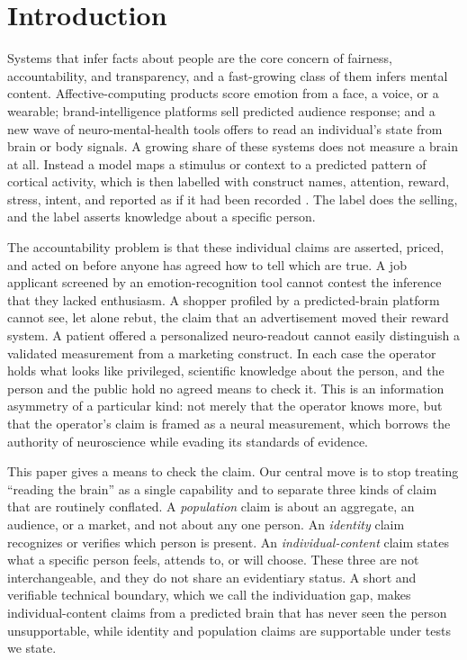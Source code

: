 \documentclass[sigconf,review,anonymous]{acmart}
\begin{document}
\section{Introduction}
Systems that infer facts about people are the core concern of fairness, accountability, and transparency, and
a fast-growing class of them infers mental content. Affective-computing products score emotion from a face,
a voice, or a wearable; brand-intelligence platforms sell predicted audience response; and a new wave of
neuro-mental-health tools offers to read an individual's state from brain or body signals. A growing share of
these systems does not measure a brain at all. Instead a model maps a stimulus or context to a predicted
pattern of cortical activity, which is then labelled with construct names, attention, reward, stress, intent,
and reported as if it had been recorded \cite{poldrack2006,hutzler2013,yao2024}. The label does the selling,
and the label asserts knowledge about a specific person.

The accountability problem is that these individual claims are asserted, priced, and acted on before anyone
has agreed how to tell which are true. A job applicant screened by an emotion-recognition tool cannot contest
the inference that they lacked enthusiasm. A shopper profiled by a predicted-brain platform cannot see, let
alone rebut, the claim that an advertisement moved their reward system. A patient offered a personalized
neuro-readout cannot easily distinguish a validated measurement from a marketing construct. In each case the
operator holds what looks like privileged, scientific knowledge about the person, and the person and the
public hold no agreed means to check it. This is an information asymmetry of a particular kind: not merely
that the operator knows more, but that the operator's claim is framed as a neural measurement, which borrows
the authority of neuroscience while evading its standards of evidence.

This paper gives a means to check the claim. Our central move is to stop treating ``reading the brain'' as a
single capability and to separate three kinds of claim that are routinely conflated. A \emph{population}
claim is about an aggregate, an audience, or a market, and not about any one person. An \emph{identity} claim
recognizes or verifies which person is present. An \emph{individual-content} claim states what a specific
person feels, attends to, or will choose. These three are not interchangeable, and they do not share an
evidentiary status. A short and verifiable technical boundary, which we call the individuation gap, makes
individual-content claims from a predicted brain that has never seen the person unsupportable, while identity
and population claims are supportable under tests we state.
\end{document}
